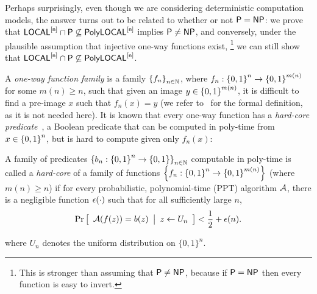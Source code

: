 Perhaps surprisingly,
even though we are considering deterministic computation models,
the answer turns out to be related to whether or not ${\mathsf{P}} = {\mathsf{NP}}$:
we prove that
${\mathsf{LOCAL}}^{[\mathsf{n}]} \cap {\mathsf{P}} \not \subseteq \mathsf{PolyLOCAL}^{[\mathsf{n}]}$ implies ${\mathsf{P}} \neq {\mathsf{NP}}$,
and conversely, under the plausible assumption that injective one-way functions exist,%
\footnote{This is stronger than assuming that ${\mathsf{P}} \neq {\mathsf{NP}}$,
because if ${\mathsf{P}} = {\mathsf{NP}}$ then every function is easy to invert.}
we can still show that 
${\mathsf{LOCAL}}^{[\mathsf{n}]} \cap {\mathsf{P}} \not \subseteq \mathsf{PolyLOCAL}^{[\mathsf{n}]}$.

A \emph{one-way function family} is a family $\left \{{ f_n } \right \}_{n \in \mathbb{N}}$,
where $f_n : \left \{{0,1} \right \}^n \rightarrow \left \{{0,1} \right \}^{m(n)}$ for some $m(n) \geq n$,
such that given an image $y \in \left \{{0,1} \right \}^{m(n)}$,
it is difficult to find a pre-image $x$ such that $f_n(x) = y$ (we refer to~\cite{OdedBook} for the formal definition,
as it is not needed here).
It is known that every one-way function has a \emph{hard-core predicate}~\cite{GL89},
a Boolean predicate that can be computed in poly-time from $x \in \left \{{0,1} \right \}^n$,
but is hard to compute given only $f_n(x)$:
\begin{definition}\label{def:HCP}
	A family of predicates %
 $ \left \{{ b_n : \left \{{0,1} \right \}^n \rightarrow \left \{{0,1} \right \}} \right \}_{n \in \mathbb{N}}$
computable in poly-time
 is called a \emph{hard-core} of a
	family of functions $\left \{{ f_n : \left \{{0,1} \right \}^n \rightarrow \left \{{0,1} \right \}^{m(n)}} \right \}$ (where $m(n) \geq n$)
	if for every probabilistic, polynomial-time (PPT) algorithm $\mathcal{A}$, there is a negligible function $\epsilon(\cdot)$ such that
	for all sufficiently large $n$,
	\begin{equation*}
		\Pr \left[ \begin{array}{ll} 
			\mathcal{A}( f(z) ) = b(z)
		 \end{array} \middle\vert \begin{array}{ll} 
			z \leftarrow U_n
		 \end{array} \right]
		<
		\frac{1}{2} + \epsilon(n).
	\end{equation*}
\end{definition}
where $U_n$ denotes the uniform distribution on $\{0,1\}^n$.

